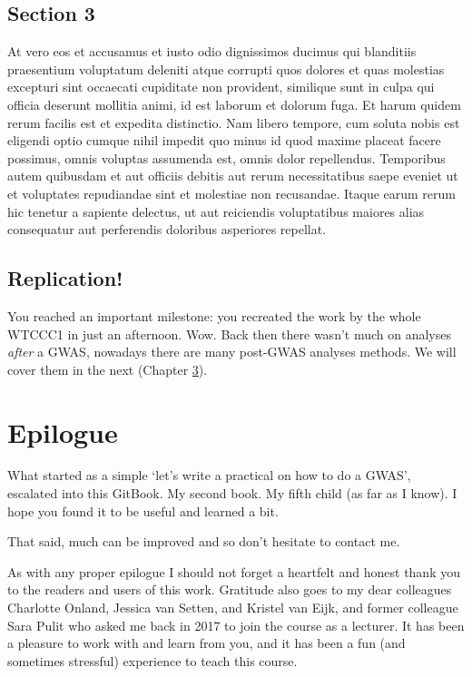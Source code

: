 \documentclass[
]{book}
\begin{document}
\hypertarget{section-3-2}{%
\section{Section 3}\label{section-3-2}}

At vero eos et accusamus et iusto odio dignissimos ducimus qui blanditiis praesentium voluptatum deleniti atque corrupti quos dolores et quas molestias excepturi sint occaecati cupiditate non provident, similique sunt in culpa qui officia deserunt mollitia animi, id est laborum et dolorum fuga. Et harum quidem rerum facilis est et expedita distinctio. Nam libero tempore, cum soluta nobis est eligendi optio cumque nihil impedit quo minus id quod maxime placeat facere possimus, omnis voluptas assumenda est, omnis dolor repellendus. Temporibus autem quibusdam et aut officiis debitis aut rerum necessitatibus saepe eveniet ut et voluptates repudiandae sint et molestiae non recusandae. Itaque earum rerum hic tenetur a sapiente delectus, ut aut reiciendis voluptatibus maiores alias consequatur aut perferendis doloribus asperiores repellat.

\hypertarget{replication-3}{%
\section{Replication!}\label{replication-3}}

You reached an important milestone: you recreated the work by the whole WTCCC1 in just an afternoon. Wow. Back then there wasn't much on analyses \emph{after} a GWAS, nowadays there are many post-GWAS analyses methods. We will cover them in the next (Chapter \ref{epilogue}).

\hypertarget{epilogue}{%
\chapter{Epilogue}\label{epilogue}}

What started as a simple `let's write a practical on how to do a GWAS', escalated into this GitBook. My second book. My fifth child (as far as I know). I hope you found it to be useful and learned a bit.

That said, much can be improved and so don't hesitate to contact me.

As with any proper epilogue I should not forget a heartfelt and honest thank you to the readers and users of this work. Gratitude also goes to my dear colleagues Charlotte Onland, Jessica van Setten, and Kristel van Eijk, and former colleague Sara Pulit who asked me back in 2017 to join the course as a lecturer. It has been a pleasure to work with and learn from you, and it has been a fun (and sometimes stressful) experience to teach this course.
\end{document}
